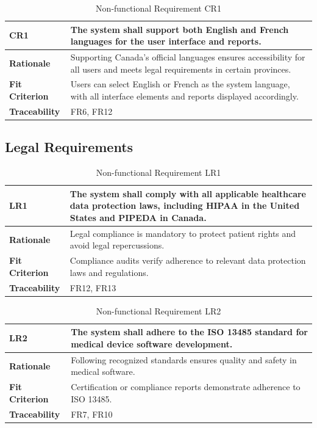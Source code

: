 \documentclass[12pt]{article}
\begin{document}
\begin{table}[h!]
\centering
{}
\begin{tabular}{|p{3.5cm}|p{11.5cm}|}
\hline
\rowcolor{gray!30}
\textbf{CR1} & The system shall support both English and French languages for the user interface and reports. \\
\hline
\textbf{Rationale} & Supporting Canada's official languages ensures accessibility for all users and meets legal requirements in certain provinces. \\
\hline
\textbf{Fit Criterion} & Users can select English or French as the system language, with all interface elements and reports displayed accordingly. \\
\hline
\textbf{Traceability} & FR6, FR12 \\
\hline
\end{tabular}
\caption{Non-functional Requirement CR1}
\end{table}
\clearpage
\subsection{Legal Requirements}

\begin{table}[h!]
\centering
{}
\begin{tabular}{|p{3.5cm}|p{11.5cm}|}
\hline
\rowcolor{gray!30}
\textbf{LR1} & The system shall comply with all applicable healthcare data protection laws, including HIPAA in the United States and PIPEDA in Canada. \\
\hline
\textbf{Rationale} & Legal compliance is mandatory to protect patient rights and avoid legal repercussions. \\
\hline
\textbf{Fit Criterion} & Compliance audits verify adherence to relevant data protection laws and regulations. \\
\hline
\textbf{Traceability} & FR12, FR13 \\
\hline
\end{tabular}
\caption{Non-functional Requirement LR1}
\end{table}

\begin{table}[h!]
\centering
{}
\begin{tabular}{|p{3.5cm}|p{11.5cm}|}
\hline
\rowcolor{gray!30}
\textbf{LR2} & The system shall adhere to the ISO 13485 standard for medical device software development. \\
\hline
\textbf{Rationale} & Following recognized standards ensures quality and safety in medical software. \\
\hline
\textbf{Fit Criterion} & Certification or compliance reports demonstrate adherence to ISO 13485. \\
\hline
\textbf{Traceability} & FR7, FR10 \\
\hline
\end{tabular}
\caption{Non-functional Requirement LR2}
\end{table}
\clearpage
\end{document}
